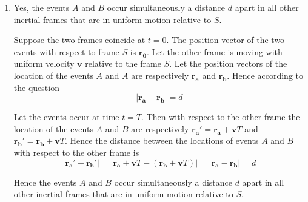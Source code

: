 \documentclass{article}
\newcommand{\bma}{\boldsymbol{a}}
\newcommand{\bmb}{\boldsymbol{b}}
\newcommand{\bmr}{\boldsymbol{r}}
\newcommand{\bmv}{\boldsymbol{v}}
\begin{document}
\begin{enumerate}
	\item Yes, the events $A$ and $B$ occur simultaneously a distance $d$ apart in all other inertial frames that are in uniform motion relative to $S$.
	
	Suppose the two frames coincide at $t=0$. The position vector of the two events with respect to  frame $S$ is $\bmr_{\boldsymbol{0}}$. Let the other frame is moving with uniform velocity $\bmv$ relative to the frame $S$. Let the position vectors of the location of the events $A$ and $A$ are respectively $\bmr_{\bma}$ and $\bmr_{\bmb}$. Hence according to the question $$|\bmr_{\bma}-\bmr_{\bmb}|=d$$
	
	Let the events occur at time $t=T$. Then with respect to the other frame the location of the events $A$ and $B$ are respectively $\bmr_{\bma}'=\bmr_{\bma}+\bmv T$ and $\bmr_{\bmb}'=\bmr_{\bmb}+\bmv T$. Hence the distance between the locations of events $A$ and $B$ with respect to the other frame is $$|\bmr_{\bma}'-\bmr_{\bmb}'|=|\bmr_{\bma}+\bmv T-(\bmr_{\bmb}+\bmv T)|=|\bmr_{\bma}-\bmr_{\bmb}|=d$$
	
	Hence the events $A$ and $B$ occur simultaneously a distance $d$ apart in all other inertial frames that are in uniform motion relative to $S$.
	

\end{enumerate}
\end{document}

